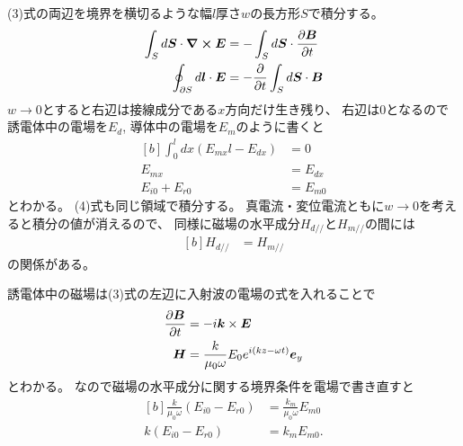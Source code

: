 \documentclass[../../master.tex]{subfiles}
\begin{document}
\subsection{}
(3)式の両辺を境界を横切るような幅\(l\)厚さ\(w\)の長方形\(S\)で積分する。
\begin{equation}\begin{aligned}[b]
    \int_{S}d \vb*{S}\cdot \curl{\vb*{E}} &= -\int_{S}d \vb*{S}\cdot \pdv{\vb*{B}}{t}\\
    \oint_{\partial S}d \vb*{l}\cdot \vb*{E} &= -\pdv{t} \int_{S}d \vb*{S}\cdot \vb*{B}
\end{aligned}\end{equation}
\(w\to0\)とすると右辺は接線成分である\(x\)方向だけ生き残り、
右辺は0となるので誘電体中の電場を\(E_d\), 導体中の電場を\(E_m\)のように書くと
\begin{equation}\begin{aligned}[b]
    \int_{0}^{l}dx (E_{mx}l-E_{dx})&=0\\
    E_{mx} &= E_{dx}\\
    E_{i0}+E_{r0} &= E_{m0}
\end{aligned}\end{equation}
とわかる。
(4)式も同じ領域で積分する。
真電流・変位電流ともに\(w\to0\)を考えると積分の値が消えるので、
同様に磁場の水平成分\(H_{d//}\)と\(H_{m//}\)の間には
\begin{equation}\begin{aligned}[b]
    H_{d//} &= H_{m//}
\end{aligned}\end{equation}
の関係がある。

誘電体中の磁場は(3)式の左辺に入射波の電場の式を入れることで
\begin{equation}\begin{aligned}[b]
    \pdv{\vb*{B}}{t} &= - i \vb*{k}\times \vb*{E}\\
    \vb*{H} &= \frac{k}{\mu_0 \omega} E_{0}e^{i(kz-\omega t)} \vb*{e}_y
\end{aligned}\end{equation}
とわかる。
なので磁場の水平成分に関する境界条件を電場で書き直すと
\begin{equation}\begin{aligned}[b]
    \frac{k}{\mu_0 \omega}(E_{i0}-E_{r0}) &= \frac{k_m}{\mu_0 \omega}E_{m0}\\
    k(E_{i0}-E_{r0}) &= k_m E_{m0}.
\end{aligned}\end{equation}
\end{document}
